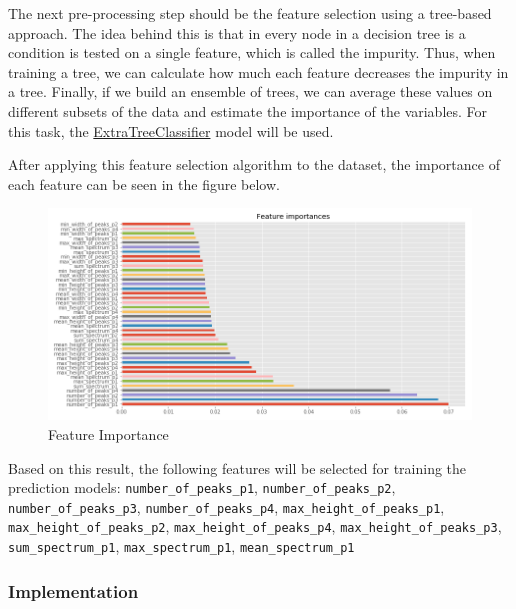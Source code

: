 \documentclass[11pt]{article}
\makeatletter
\def\maxwidth{\ifdim\Gin@nat@width>\linewidth\linewidth
    \else\Gin@nat@width\fi}
\let\Oldincludegraphics\includegraphics
\renewcommand{\includegraphics}[1]{\Oldincludegraphics[width=.8\maxwidth]{#1}}
\makeatother
\begin{document}
The next pre-processing step should be the feature selection using a
tree-based approach. The idea behind this is that in every node in a
decision tree is a condition is tested on a single feature, which is
called the impurity. Thus, when training a tree, we can calculate how
much each feature decreases the impurity in a tree. Finally, if we build
an ensemble of trees, we can average these values on different subsets
of the data and estimate the importance of the variables. For this task,
the
\href{https://scikit-learn.org/stable/modules/generated/sklearn.ensemble.ExtraTreesClassifier.html}{ExtraTreeClassifier}
model will be used.

After applying this feature selection algorithm to the dataset, the
importance of each feature can be seen in the figure below.

\begin{figure}
\centering
\includegraphics{feature_importances.png}
\caption{Feature Importance}
\end{figure}

Based on this result, the following features will be selected for
training the prediction models: \texttt{number\_of\_peaks\_p1},
\texttt{number\_of\_peaks\_p2}, \texttt{number\_of\_peaks\_p3},
\texttt{number\_of\_peaks\_p4}, \texttt{max\_height\_of\_peaks\_p1},
\texttt{max\_height\_of\_peaks\_p2},
\texttt{max\_height\_of\_peaks\_p4},
\texttt{max\_height\_of\_peaks\_p3}, \texttt{sum\_spectrum\_p1},
\texttt{max\_spectrum\_p1}, \texttt{mean\_spectrum\_p1}

\hypertarget{implementation}{%
\subsubsection{Implementation}\label{implementation}}
\end{document}
